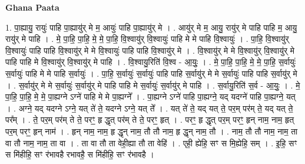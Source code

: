 \documentclass[17pt]{extarticle}
\begin{document}
\textbf{Ghana Paata } \newline

1. पा॒ह्यायु॒ रायुः॑ पाहि पा॒ह्यायु॑र् मे म॒ आयुः॑ पाहि पा॒ह्यायु॑र् मे । . आयु॑र् मे म॒ आयु॒ रायु॑र् मे पाहि पाहि म॒ आयु॒ रायु॑र् मे पाहि । . मे॒ पा॒हि॒ पा॒हि॒ मे॒ मे॒ पा॒हि॒ वि॒श्वायु॑र् वि॒श्वायुः॑ पाहि मे मे पाहि वि॒श्वायुः॑ । . पा॒हि॒ वि॒श्वायु॑र् वि॒श्वायुः॑ पाहि पाहि वि॒श्वायु॑र् मे मे वि॒श्वायुः॑ पाहि पाहि वि॒श्वायु॑र् मे । . वि॒श्वायु॑र् मे मे वि॒श्वायु॑र् वि॒श्वायु॑र् मे पाहि पाहि मे वि॒श्वायु॑र् वि॒श्वायु॑र् मे पाहि । . वि॒श्वायु॒रिति॑ वि॒श्व - आ॒युः॒ । . मे॒ पा॒हि॒ पा॒हि॒ मे॒ मे॒ पा॒हि॒ स॒र्वायुः॑ स॒र्वायुः॑ पाहि मे मे पाहि स॒र्वायुः॑ । . पा॒हि॒ स॒र्वायुः॑ स॒र्वायुः॑ पाहि पाहि स॒र्वायु॑र् मे मे स॒र्वायुः॑ पाहि पाहि स॒र्वायु॑र् मे । . स॒र्वायु॑र् मे मे स॒र्वायुः॑ स॒र्वायु॑र् मे पाहि पाहि मे स॒र्वायुः॑ स॒र्वायु॑र् मे पाहि । . स॒र्वायु॒रिति॑ स॒र्व - आ॒युः॒ । . मे॒ पा॒हि॒ पा॒हि॒ मे॒ मे॒ पा॒ह्यग्ने ऽग्ने॑ पाहि मे मे पा॒ह्यग्ने᳚ । . पा॒ह्यग्ने ऽग्ने॑ पाहि पा॒ह्यग्ने॒ यद् यदग्ने॑ पाहि पा॒ह्यग्ने॒ यत् । . अग्ने॒ यद् यदग्ने ऽग्ने॒ यत् ते॑ ते॒ यदग्ने ऽग्ने॒ यत् ते᳚ । . यत् ते॑ ते॒ यद् यत् ते॒ पर॒म् पर॑म् ते॒ यद् यत् ते॒ पर᳚म् । . ते॒ पर॒म् पर॑म् ते ते॒ परꣳ॒॒ हृ द्धृत् पर॑म् ते ते॒ परꣳ॒॒ हृत् । . परꣳ॒॒ हृ द्धृत् पर॒म् परꣳ॒॒ हृन् नाम॒ नाम॒ हृत् पर॒म् परꣳ॒॒ हृन् नाम॑ । . हृन् नाम॒ नाम॒ हृ द्धृन् नाम॒ तौ तौ नाम॒ हृ द्धृन् नाम॒ तौ । . नाम॒ तौ तौ नाम॒ नाम॒ ता वा तौ नाम॒ नाम॒ ता वा । . ता वा तौ ता वेही॒ह्या तौ ता वेहि॑ । . एही॒ ह्येहि॒ सꣳ स मि॒ह्येहि॒ सम् । . इ॒हि॒ सꣳ स मि॑हीहि॒ सꣳ र॑भावहै रभावहै॒ स मि॑हीहि॒ सꣳ र॑भावहै । \newline
\end{document}
